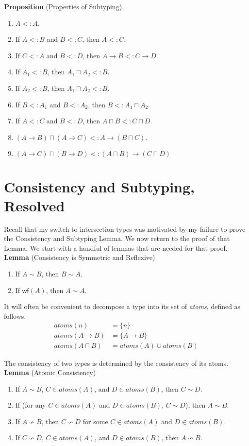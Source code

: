 \documentclass{article}
\newcommand{\WF}[1]{\mathsf{wf}(#1)}
\newcommand{\ATOMS}[1]{\mathit{atoms}(#1)}
\begin{document}
\noindent \textbf{Proposition} (Properties of Subtyping) 
\begin{enumerate}
\item $A <: A$.
\item If $A <: B$ and $B <: C$, then $A <: C$. 
\item If $C <: A$ and $B <: D$, then $A \to B <: C \to D$.
\item If $A_1 <: B$, then $A_1 \sqcap A_2 <: B$.
\item If $A_2 <: B$, then $A_1 \sqcap A_2 <: B$.
\item If $B <: A_1$ and $B <: A_2$, then $B <: A_1 \sqcap A_2$.
\item If $A <: C$ and $B <: D$, then $A \sqcap B <: C \sqcap D$.
\item $(A\to B) \sqcap (A \to C) <: A \to (B \sqcap C)$.
\item $(A \to C) \sqcap (B \to D) <: (A\sqcap B) \to (C \sqcap D)$
\end{enumerate}
  

\section{Consistency and Subtyping, Resolved}

Recall that my switch to intersection types was motivated by my
failure to prove the Consistency and Subtyping Lemma.  We now return
to the proof of that Lemma. We start with a handful of lemmas that are
needed for that proof. \\

\noindent \textbf{Lemma} (Consistency is Symmetric and Reflexive) 
%
\begin{enumerate}
\item If $A \sim B$, then $B \sim A$.
\item If $\WF{A}$, then $A \sim A$.
\end{enumerate}

It will often be convenient to decompose a type into its set of
\emph{atoms}, defined as follows.
\begin{align*}
  \ATOMS{n} &= \{ n \} \\
  \ATOMS{A\to B} &= \{ A \to B \} \\
  \ATOMS{A \sqcap B} &= \ATOMS{A} \cup \ATOMS{B}
\end{align*}

The consistency of two types is determined by the consistency of its
atoms. \\

\noindent \textbf{Lemma} (Atomic Consistency) 
\begin{enumerate}
\item If $A \sim B$, $C \in \ATOMS{A}$, and $D \in \ATOMS{B}$,
  then $C \sim D$.
\item If (for any $C \in \ATOMS{A}$ and $D \in \ATOMS{B}$, 
  $C \sim D$), then $A \sim B$.
\item If $A \not\sim B$, then $C \not\sim D$ for some
  $C \in \ATOMS{A}$ and $D \in \ATOMS{B}$.
\item If $C \not\sim D$, $C \in \ATOMS{A}$, and $D \in \ATOMS{B}$,
  then $A \not\sim B$. 
\end{enumerate}
\end{document}
